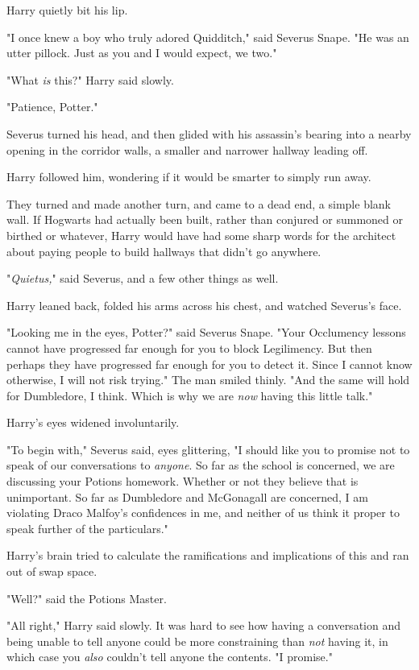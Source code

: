 Harry quietly bit his lip.

"I once knew a boy who truly adored Quidditch," said Severus Snape. "He was an 
utter pillock. Just as you and I would expect, we two."

"What \emph{is} this?" Harry said slowly.

"Patience, Potter."

Severus turned his head, and then glided with his assassin's bearing into a 
nearby opening in the corridor walls, a smaller and narrower hallway leading 
off.

Harry followed him, wondering if it would be smarter to simply run away.

They turned and made another turn, and came to a dead end, a simple blank wall. 
If Hogwarts had actually been built, rather than conjured or summoned or 
birthed or whatever, Harry would have had some sharp words for the architect 
about paying people to build hallways that didn't go anywhere.

"\emph{Quietus,}" said Severus, and a few other things as well.

Harry leaned back, folded his arms across his chest, and watched Severus's face.

"Looking me in the eyes, Potter?" said Severus Snape. "Your Occlumency lessons 
cannot have progressed far enough for you to block Legilimency. But then 
perhaps they have progressed far enough for you to detect it. Since I cannot 
know otherwise, I will not risk trying." The man smiled thinly. "And the same 
will hold for Dumbledore, I think. Which is why we are \emph{now} having this 
little talk."

Harry's eyes widened involuntarily.

"To begin with," Severus said, eyes glittering, "I should like you to promise 
not to speak of our conversations to \emph{anyone}. So far as the school is 
concerned, we are discussing your Potions homework. Whether or not they believe 
that is unimportant. So far as Dumbledore and McGonagall are concerned, I am 
violating Draco Malfoy's confidences in me, and neither of us think it proper 
to speak further of the particulars."

Harry's brain tried to calculate the ramifications and implications of this and 
ran out of swap space.

"Well?" said the Potions Master.

"All right," Harry said slowly. It was hard to see how having a conversation 
and being unable to tell anyone could be more constraining than \emph{not} 
having it, in which case you \emph{also} couldn't tell anyone the contents. "I 
promise."

